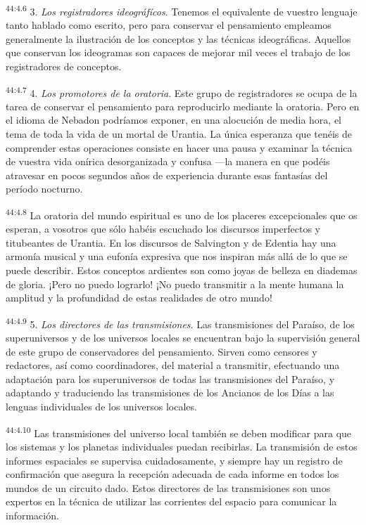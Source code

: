 \par
\textsuperscript{44:4.6} 3. \textit{Los registradores ideográfícos}. Tenemos el equivalente de vuestro lenguaje tanto hablado como escrito, pero para conservar el pensamiento empleamos generalmente la ilustración de los conceptos y las técnicas ideográficas. Aquellos que conservan los ideogramas son capaces de mejorar mil veces el trabajo de los registradores de conceptos.

\par
\textsuperscript{44:4.7} 4. \textit{Los promotores de la oratoria}. Este grupo de registradores se ocupa de la tarea de conservar el pensamiento para reproducirlo mediante la oratoria. Pero en el idioma de Nebadon podríamos exponer, en una alocución de media hora, el tema de toda la vida de un mortal de Urantia. La única esperanza que tenéis de comprender estas operaciones consiste en hacer una pausa y examinar la técnica de vuestra vida onírica desorganizada y confusa ---la manera en que podéis atravesar en pocos segundos años de experiencia durante esas fantasías del período nocturno.

\par
\textsuperscript{44:4.8} La oratoria del mundo espiritual es uno de los placeres excepcionales que os esperan, a vosotros que sólo habéis escuchado los discursos imperfectos y titubeantes de Urantia. En los discursos de Salvington y de Edentia hay una armonía musical y una eufonía expresiva que nos inspiran más allá de lo que se puede describir. Estos conceptos ardientes son como joyas de belleza en diademas de gloria. ¡Pero no puedo lograrlo! ¡No puedo transmitir a la mente humana la amplitud y la profundidad de estas realidades de otro mundo!

\par
\textsuperscript{44:4.9} 5. \textit{Los directores de las transmisiones}. Las transmisiones del Paraíso, de los superuniversos y de los universos locales se encuentran bajo la supervisión general de este grupo de conservadores del pensamiento. Sirven como censores y redactores, así como coordinadores, del material a transmitir, efectuando una adaptación para los superuniversos de todas las transmisiones del Paraíso, y adaptando y traduciendo las transmisiones de los Ancianos de los Días a las lenguas individuales de los universos locales.

\par
\textsuperscript{44:4.10} Las transmisiones del universo local también se deben modificar para que los sistemas y los planetas individuales puedan recibirlas. La transmisión de estos informes espaciales se supervisa cuidadosamente, y siempre hay un registro de confirmación que asegura la recepción adecuada de cada informe en todos los mundos de un circuito dado. Estos directores de las transmisiones son unos expertos en la técnica de utilizar las corrientes del espacio para comunicar la información.

